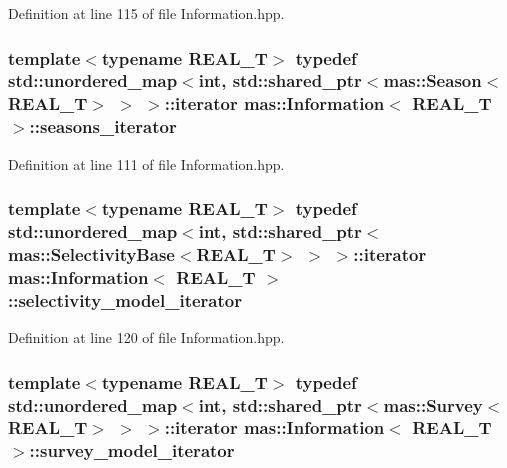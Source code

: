 Definition at line 115 of file Information.\-hpp.

\hypertarget{classmas_1_1_information_a4ada3467c12527ed5400cc67e80e31f2}{
\subsubsection[{seasons\-\_\-iterator}]{\setlength{\rightskip}{0pt plus 5cm}template$<$typename R\-E\-A\-L\-\_\-\-T$>$ typedef std\-::unordered\-\_\-map$<$int, std\-::shared\-\_\-ptr$<${\bf mas\-::\-Season}$<$R\-E\-A\-L\-\_\-\-T$>$ $>$ $>$\-::iterator {\bf mas\-::\-Information}$<$ R\-E\-A\-L\-\_\-\-T $>$\-::{\bf seasons\-\_\-iterator}}}\label{classmas_1_1_information_a4ada3467c12527ed5400cc67e80e31f2}


Definition at line 111 of file Information.\-hpp.

\hypertarget{classmas_1_1_information_a0760e4946119a28f018ff73cbdd0171f}{
\subsubsection[{selectivity\-\_\-model\-\_\-iterator}]{\setlength{\rightskip}{0pt plus 5cm}template$<$typename R\-E\-A\-L\-\_\-\-T$>$ typedef std\-::unordered\-\_\-map$<$int, std\-::shared\-\_\-ptr$<${\bf mas\-::\-Selectivity\-Base}$<$R\-E\-A\-L\-\_\-\-T$>$ $>$ $>$\-::iterator {\bf mas\-::\-Information}$<$ R\-E\-A\-L\-\_\-\-T $>$\-::{\bf selectivity\-\_\-model\-\_\-iterator}}}\label{classmas_1_1_information_a0760e4946119a28f018ff73cbdd0171f}


Definition at line 120 of file Information.\-hpp.

\hypertarget{classmas_1_1_information_ababaa75ccc01c68865bae68aa44453b3}{
\subsubsection[{survey\-\_\-model\-\_\-iterator}]{\setlength{\rightskip}{0pt plus 5cm}template$<$typename R\-E\-A\-L\-\_\-\-T$>$ typedef std\-::unordered\-\_\-map$<$int, std\-::shared\-\_\-ptr$<${\bf mas\-::\-Survey}$<$R\-E\-A\-L\-\_\-\-T$>$ $>$ $>$\-::iterator {\bf mas\-::\-Information}$<$ R\-E\-A\-L\-\_\-\-T $>$\-::{\bf survey\-\_\-model\-\_\-iterator}}}\label{classmas_1_1_information_ababaa75ccc01c68865bae68aa44453b3}


